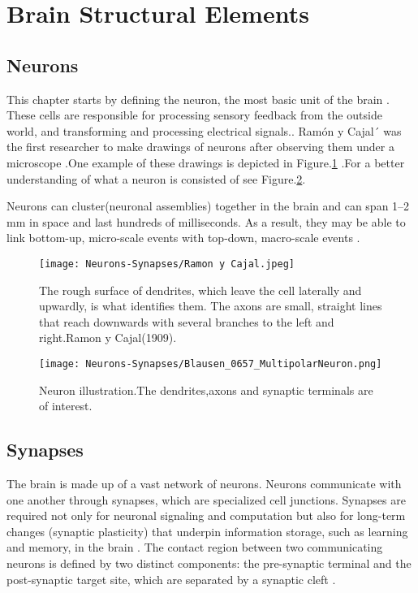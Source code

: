 \documentclass[12pt]{report}
\begin{document}
\section{Brain Structural Elements}
\subsection{Neurons}
This chapter starts by defining the neuron, the most basic unit of the brain \cite{gerstner2014}. These cells are responsible for processing sensory feedback from the outside world, and transforming and processing electrical signals.\cite{balduzzi2013}. Ramón y Cajal´ was the first researcher to make drawings of neurons after observing them under a microscope\cite{garcialopezp2010}
.One example of these drawings is depicted in Figure.\ref{fig:neurons-ramoncajal} .For a better understanding of what a neuron is consisted of see Figure.\ref{fig:neurons-multipolar}.

Neurons can cluster(neuronal assemblies) together in the brain and can span 1–2 mm in space and last hundreds of milliseconds. As a result, they may be able to link bottom-up, micro-scale events with top-down, macro-scale events \cite{Badin2017} .

\begin{figure}[htp]
    \centering
    \texttt{[image: Neurons-Synapses/Ramon y Cajal.jpeg]}
    \caption{The rough surface of dendrites, which leave the cell laterally and upwardly, is what identifies them. The axons are small, straight lines that reach downwards with several branches to the left and right.Ramon y Cajal(1909).}
    \label{fig:neurons-ramoncajal}
\end{figure}
\begin{figure}[htp]
    \centering
    \texttt{[image: Neurons-Synapses/Blausen\_0657\_MultipolarNeuron.png]}
    \caption{Neuron illustration.The dendrites,axons and synaptic terminals are of interest.}
    \label{fig:neurons-multipolar}
\end{figure}
\subsection{Synapses}
The brain is made up of a vast network of neurons. Neurons communicate with one another through synapses, which are specialized cell junctions. Synapses are required not only for neuronal signaling and computation but also for long-term changes (synaptic plasticity) that underpin information storage, such as learning and memory, in the brain  \cite{li2003}. The contact region between two communicating neurons is defined by two distinct components: the pre-synaptic terminal and the post-synaptic target site, which are separated by a synaptic cleft .
\end{document}
